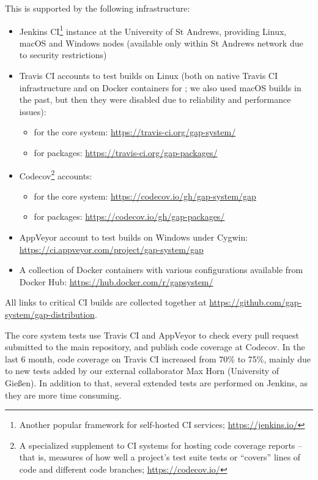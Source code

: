 \documentclass{deliverablereport}
\begin{document}
This is supported by the following infrastructure:
\begin{itemize}
\item Jenkins CI\footnote{Another popular framework for self-hosted CI
services; \url{https://jenkins.io/}} instance at the University of St Andrews,
providing Linux, macOS and Windows nodes (available only within St
Andrews network due to security restrictions)
\item Travis CI accounts to test builds on Linux (both on native 
Travis CI infrastructure and on Docker containers for \GAP; we
also used macOS builds in the past, but then they were disabled
due to reliability and performance issues):
\begin{itemize}
\item for the core \GAP system: \url{https://travis-ci.org/gap-system/}
\item for \GAP packages: \url{https://travis-ci.org/gap-packages/}
\end{itemize}
\item Codecov\footnote{A specialized supplement to CI systems for hosting code
 coverage reports -- that is, measures of how well a project's test suite
 tests or ``covers'' lines of code and different code branches;
 \url{https://codecov.io/}} accounts:
\begin{itemize}
\item for the core \GAP system: \url{https://codecov.io/gh/gap-system/gap}
\item for \GAP packages: \url{https://codecov.io/gh/gap-packages/}
\end{itemize}
\item AppVeyor account to test builds on Windows under Cygwin: \url{https://ci.appveyor.com/project/gap-system/gap}
\item A collection of Docker containers with various configurations available from
Docker Hub: \url{https://hub.docker.com/r/gapsystem/}
\end{itemize}
All links to critical CI builds are collected together 
at \url{https://github.com/gap-system/gap-distribution}.

The core \GAP system tests use Travis CI and AppVeyor 
to check every pull request submitted to the main \GAP repository,
and publish code coverage at Codecov. In the last 6 month, code
coverage on Travis CI increased from 70\% to 75\%, mainly due to
new tests added by our external collaborator Max Horn (University of Gie{\ss}en).
In addition to that, several extended tests are performed on Jenkins,
as they are more time consuming. 
\end{document}
